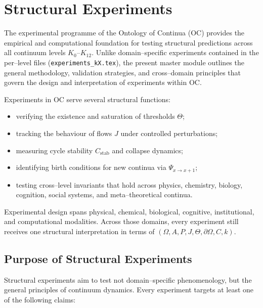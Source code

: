 
\section{Structural Experiments}
\label{sec:experiments-master}

The experimental programme of the Ontology of Continua (OC) provides the
empirical and computational foundation for testing structural predictions
across all continuum levels $K_0$–$K_{12}$.  
Unlike domain–specific experiments contained in the per–level files
(\texttt{experiments\_kX.tex}), the present master module outlines the
general methodology, validation strategies, and cross–domain principles
that govern the design and interpretation of experiments within OC.

Experiments in OC serve several structural functions:
\begin{itemize}
    \item verifying the existence and saturation of thresholds $\Theta$;
    \item tracking the behaviour of flows $J$ under controlled perturbations;
    \item measuring cycle stability $C_{\mathrm{stab}}$ and collapse dynamics;
    \item identifying birth conditions for new continua via $\Psi_{x\to x+1}$;
    \item testing cross–level invariants that hold across physics, chemistry,
          biology, cognition, social systems, and meta–theoretical continua.
\end{itemize}

Experimental design spans physical, chemical, biological, cognitive,
institutional, and computational modalities. Across those domains, every
experiment still receives one structural interpretation in terms of
$(\Omega, A, P, J, \Theta, \partial\Omega, C, k)$.


\subsection{Purpose of Structural Experiments}

Structural experiments aim to test not domain–specific phenomenology, but the
general principles of continuum dynamics.  
Every experiment targets at least one of the following claims:

